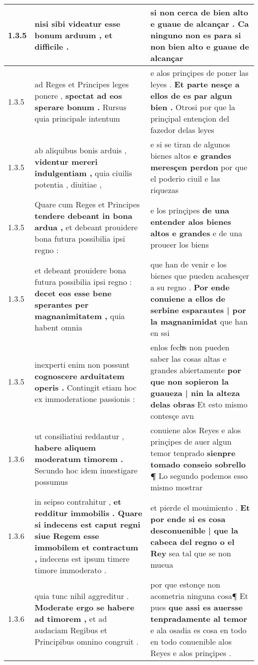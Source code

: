 \begin{tabular}{|p{1cm}|p{6.5cm}|p{6.5cm}|}
1.3.5 & nisi sibi videatur \textbf{ esse bonum arduum , } et difficile . & si non cerca de bien alto e guaue de alcançar . \textbf{ Ca ninguno non es para si non bien alto } e guaue de alcançar \\\hline
1.3.5 & ad Reges et Principes leges ponere , \textbf{ spectat ad eos sperare bonum . } Rursus quia principale intentum & e alos prinçipes de poner las leyes . \textbf{ Et parte nesçe a ellos de es par algun bien . } Otrosi por que la prinçipal entençion del fazedor delas leyes \\\hline
1.3.5 & ab aliquibus bonis arduis , \textbf{ videntur mereri indulgentiam , } quia ciuilis potentia , diuitiae , & e si se tiran de algunos bienes altos \textbf{ e grandes meresçen perdon } por que el poderio ciuil e las riquezas \\\hline
1.3.5 & Quare cum Reges et Principes \textbf{ tendere debeant in bona ardua , } et debeant prouidere bona futura possibilia ipsi regno : & e los prinçipes \textbf{ de una entender alos bienes altos e grandes } e de una proueer los biens \\\hline
1.3.5 & et debeant prouidere bona futura possibilia ipsi regno : \textbf{ decet eos esse bene sperantes per magnanimitatem , } quia habent omnia & que han de venir e los bienes que pueden acahesçer a su regno . \textbf{ Por ende conuiene a ellos de serbine esparautes | por la magnanimidat } que han en ssi \\\hline
1.3.5 & inexperti enim non possunt \textbf{ cognoscere arduitatem operis . } Contingit etiam hoc ex immoderatione passionis : & enlos fechͣs non pueden saber las cosas altas e grandes abiertamente \textbf{ por que non sopieron la guaueza | nin la alteza delas obras } Et esto mismo contesçe avn \\\hline
1.3.6 & ut consiliatiui reddantur , \textbf{ habere aliquem moderatum timorem . } Secundo hoc idem inuestigare possumus & conuiene alos Reyes e alos prinçipes de auer algun temor tenprado \textbf{ sienpre tomado conseio sobrello ¶ } Lo segundo podemos esso mismo mostrar \\\hline
1.3.6 & in seipso contrahitur , \textbf{ et redditur immobilis . Quare si indecens est caput regni siue Regem esse immobilem et contractum , } indecens est ipsum timere timore immoderato . & et pierde el mouimiento . \textbf{ Et por ende si es cosa desconuenible | que la cabeca del regno o el Rey } sea tal que se non mueua \\\hline
1.3.6 & quia tunc nihil aggreditur . \textbf{ Moderate ergo se habere ad timorem , } et ad audaciam Regibus et Principibus omnino congruit . & por que estonçe non acometria ninguna cosa¶ Et pues \textbf{ que assi es auersse tenpradamente al temor } e ala osadia es cosa en todo en todo conuenible alos Reyes e alos prinçipes . \\\hline

\end{tabular}
